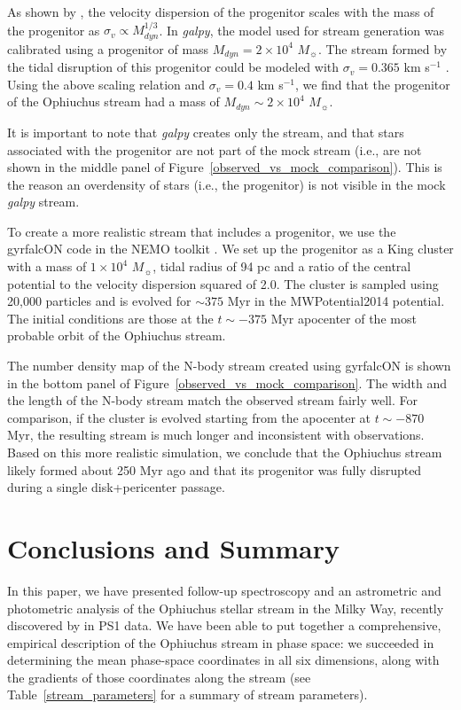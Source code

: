 \documentclass[iop]{emulateapj}
\begin{document}
As shown by \citet{sb13}, the velocity dispersion of the progenitor scales with
the mass of the progenitor as $\sigma_v \propto M_{dyn}^{1/3}$. In {\em galpy},
the model used for stream generation was calibrated using a progenitor of mass
$M_{dyn}=2\times10^4$ $M_\sun$. The stream formed by the tidal disruption of
this progenitor could be modeled with $\sigma_v=0.365$ km s$^{-1}$
\citep{bov14}. Using the above scaling relation and $\sigma_v=0.4$ km s$^{-1}$,
we find that the progenitor of the Ophiuchus stream had a mass of
$M_{dyn}\sim2\times10^4$ $M_\sun$.

It is important to note that {\em galpy} creates only the stream, and that stars
associated with the progenitor are not part of the mock stream (i.e., are not
shown in the middle panel of Figure~\ref{observed_vs_mock_comparison}). This is
the reason an overdensity of stars (i.e., the progenitor) is not visible in the
mock {\em galpy} stream.

To create a more realistic stream that includes a progenitor, we use the
gyrfalcON code \citep{deh00,deh02} in the NEMO toolkit \citep{teu95}. We set up
the progenitor as a King cluster \citep{kin66} with a mass of $1\times10^4$
$M_\sun$, tidal radius of 94 pc and a ratio of the central potential to the
velocity dispersion squared of 2.0. The cluster is sampled using 20,000
particles and is evolved for $\sim375$ Myr in the MWPotential2014 potential. The
initial conditions are those at the $t\sim-375$ Myr apocenter of the most
probable orbit of the Ophiuchus stream.

The number density map of the N-body stream created using gyrfalcON is shown in
the bottom panel of Figure~\ref{observed_vs_mock_comparison}. The width and the
length of the N-body stream match the observed stream fairly well. For
comparison, if the cluster is evolved starting from the apocenter at
$t\sim-870$ Myr, the resulting stream is much longer and inconsistent with
observations. Based on this more realistic simulation, we conclude that the
Ophiuchus stream likely formed about 250 Myr ago and that its progenitor was
fully disrupted during a single disk+pericenter passage.

\section{Conclusions and Summary}\label{conclusions}

In this paper, we have presented follow-up spectroscopy and an astrometric and
photometric analysis of the Ophiuchus stellar stream in the Milky Way, recently
discovered by \citet{ber14b} in PS1 data. We have been able to put together a
comprehensive, empirical description of the Ophiuchus stream in phase space: we
succeeded in determining the mean phase-space coordinates in all six dimensions,
along with the gradients of those coordinates along the stream (see
Table~\ref{stream_parameters} for a summary of stream parameters).
\end{document}
